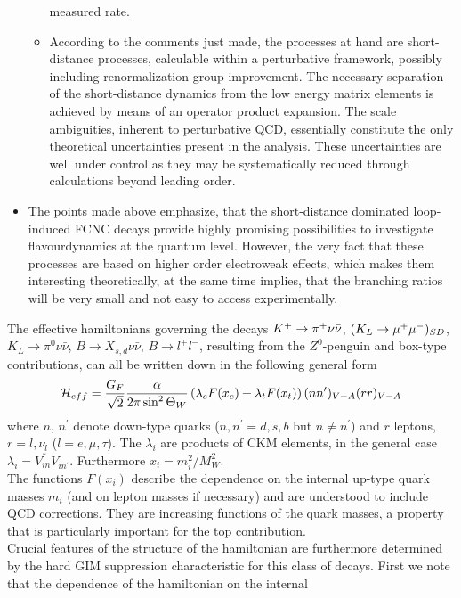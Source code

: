 \begin{itemize}
\begin{itemize}
measured rate.
\item According to the comments just made, the processes at hand are
short-distance processes, calculable within a perturbative framework,
possibly including renormalization group improvement. The necessary
separation of the short-distance dynamics from the low energy matrix
elements  is achieved by means of an operator product expansion.
The scale ambiguities, inherent to perturbative QCD, essentially
constitute the only theoretical uncertainties present in the analysis.
These uncertainties are well under control as they may be
systematically reduced through calculations beyond leading order.
\end{itemize}
\item
The points made above emphasize, that the short-distance dominated
loop-induced FCNC decays provide highly promising possibilities to
investigate flavourdynamics at the quantum level. However, the very fact
that these processes are based on higher order electroweak effects,
which makes them interesting theoretically, at the same time implies,
that the branching ratios will be very small and not easy to
access experimentally.
\end{itemize}
The effective hamiltonians governing the decays
$K^+ \to \pi^+\nu\bar\nu$, $(K_L \to \mu^+\mu^-)_{SD}$, $K_L\to\pi^0\nu\bar\nu$,
$B\to X_{s, d}\nu\bar\nu$, $B\to l^+l^-$,
resulting from the $Z^0$-penguin and box-type contributions, can all be
written down in the following general form
\begin{equation}\label{hnr} {\cal H}_{eff}={G_F \over{\sqrt 2}}{\alpha\over 2\pi \sin^2\Theta_W}
 \left( \lambda_c F(x_c) + \lambda_t F(x_t)\right)
 (\bar nn^\prime)_{V-A}(\bar rr)_{V-A}  \end{equation}
where $n$, $n^\prime$ denote down-type quarks
($n, n^\prime=d, s, b$ but $n\not= n^\prime$) and $r$ leptons,
$r=l, \nu_l$ ($l=e, \mu, \tau$). The $\lambda_i$ are products of CKM elements,
in the general case $\lambda_i=V^*_{in}V_{in^\prime}^{}$. Furthermore
$x_i=m^2_i/M^2_W$.\\
The functions $F(x_i)$ describe the dependence on the internal
up-type quark masses $m_i$ (and on lepton masses if necessary)
and are understood to include QCD corrections.
They are increasing functions of the quark masses, a property that is
particularly important for the top contribution.\\
Crucial features of the structure of the hamiltonian
are furthermore determined
by the hard GIM suppression characteristic for this class of decays.
First we note that the dependence of the hamiltonian on the internal
